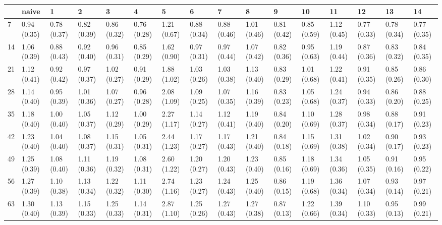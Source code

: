 \begin{tabular}{llllllllllllllll}
\toprule
{} &        naive &            1 &            2 &            3 &            4 &            5 &            6 &            7 &            8 &            9 &           10 &           11 &           12 &           13 &           14 \\
\midrule
7   &  0.94 (0.35) &  0.78 (0.37) &  0.82 (0.39) &  0.86 (0.32) &  0.76 (0.28) &  1.21 (0.67) &  0.88 (0.34) &  0.88 (0.46) &  1.01 (0.46) &  0.81 (0.42) &  0.85 (0.59) &  1.12 (0.45) &  0.77 (0.33) &  0.78 (0.34) &  0.77 (0.35) \\
14  &  1.06 (0.39) &  0.88 (0.43) &  0.92 (0.40) &  0.96 (0.31) &  0.85 (0.29) &  1.62 (0.90) &  0.97 (0.31) &  0.97 (0.44) &  1.07 (0.42) &  0.82 (0.36) &  0.95 (0.63) &  1.19 (0.44) &  0.87 (0.36) &  0.83 (0.32) &  0.84 (0.35) \\
21  &  1.12 (0.41) &  0.92 (0.42) &  0.97 (0.37) &  1.02 (0.27) &  0.91 (0.29) &  1.88 (1.02) &  1.03 (0.26) &  1.03 (0.38) &  1.13 (0.40) &  0.83 (0.29) &  1.01 (0.68) &  1.22 (0.41) &  0.91 (0.35) &  0.85 (0.26) &  0.86 (0.30) \\
28  &  1.14 (0.40) &  0.95 (0.39) &  1.01 (0.36) &  1.07 (0.27) &  0.96 (0.28) &  2.08 (1.09) &  1.09 (0.25) &  1.07 (0.35) &  1.16 (0.39) &  0.83 (0.23) &  1.05 (0.68) &  1.24 (0.37) &  0.94 (0.33) &  0.86 (0.20) &  0.88 (0.25) \\
35  &  1.18 (0.40) &  1.00 (0.40) &  1.05 (0.37) &  1.12 (0.29) &  1.00 (0.29) &  2.27 (1.17) &  1.14 (0.27) &  1.12 (0.41) &  1.19 (0.40) &  0.84 (0.20) &  1.10 (0.69) &  1.28 (0.37) &  0.98 (0.34) &  0.88 (0.17) &  0.91 (0.23) \\
42  &  1.23 (0.40) &  1.04 (0.40) &  1.08 (0.37) &  1.15 (0.31) &  1.05 (0.31) &  2.44 (1.23) &  1.17 (0.27) &  1.17 (0.43) &  1.21 (0.40) &  0.84 (0.18) &  1.15 (0.69) &  1.31 (0.38) &  1.02 (0.34) &  0.90 (0.17) &  0.93 (0.23) \\
49  &  1.25 (0.39) &  1.08 (0.40) &  1.11 (0.36) &  1.19 (0.32) &  1.08 (0.31) &  2.60 (1.22) &  1.20 (0.27) &  1.20 (0.43) &  1.23 (0.40) &  0.85 (0.16) &  1.18 (0.69) &  1.34 (0.36) &  1.05 (0.35) &  0.91 (0.16) &  0.95 (0.22) \\
56  &  1.27 (0.39) &  1.10 (0.38) &  1.13 (0.34) &  1.22 (0.32) &  1.11 (0.30) &  2.74 (1.16) &  1.23 (0.27) &  1.24 (0.43) &  1.25 (0.40) &  0.86 (0.15) &  1.19 (0.68) &  1.36 (0.34) &  1.07 (0.34) &  0.93 (0.14) &  0.97 (0.21) \\
63  &  1.30 (0.40) &  1.13 (0.39) &  1.15 (0.33) &  1.25 (0.33) &  1.14 (0.31) &  2.87 (1.10) &  1.25 (0.26) &  1.27 (0.43) &  1.27 (0.38) &  0.87 (0.13) &  1.22 (0.66) &  1.39 (0.34) &  1.10 (0.33) &  0.95 (0.13) &  0.99 (0.21) \\

\end{tabular}
